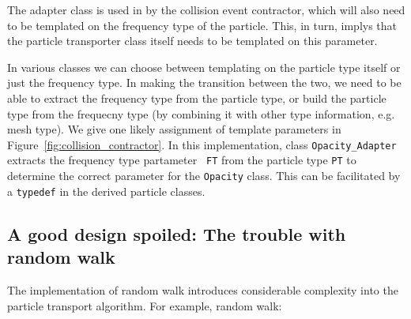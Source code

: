 \documentclass[memo]{ResearchNote}
\begin{document}
The adapter class is used in by the collision event contractor, which
will also need to be templated on the frequency type of the particle.
This, in turn, implys that the particle transporter class itself needs
to be templated on this parameter.

In various classes we can choose between templating on the particle
type itself or just the frequency type. In making the transition
between the two, we need to be able to extract the frequency type from
the particle type, or build the particle type from the frequecny type
(by combining it with other type information, e.g. mesh type). We give
one likely assignment of template parameters in
Figure~\ref{fig:collision_contractor}. In this implementation, class
{\tt Opacity\_Adapter} extracts the frequency type partameter {\tt
  FT} from the particle type {\tt PT} to determine the correct
parameter for the {\tt Opacity} class. This can be facilitated by a
{\tt typedef} in the derived particle classes.

\subsection{A good design spoiled: The trouble with random walk}

The implementation of random walk introduces considerable complexity
into the particle transport algorithm. For example, random walk:
\end{document}

